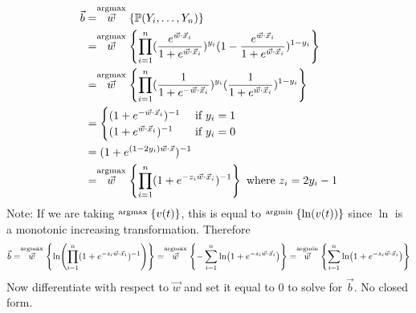 \documentclass[12pt]{article}
\begin{document}
$$\begin{aligned} \vec{b} &= \stackrel{\text{argmax}}{\vec{w}} \left\{ \mathbb{P}(Y_i, \dots,Y_n) \right\} 
\\ &= \stackrel{\text{argmax}}{\vec{w}} \left\{ \prod_{i=1}^n (\frac{e^{\vec{w} \cdot \vec{x}_i}}{1 + e^{\vec{w} \cdot \vec{x}_i}})^{y_i}(1 - \frac{e^{\vec{w} \cdot \vec{x}_i}}{1 + e^{\vec{w} \cdot \vec{x}_i}})^{1 - y_i} \right\} 
\\ &= \stackrel{\text{argmax}}{\vec{w}} \left\{  \prod_{i=1}^n (\frac{1}{1 + e^{-\vec{w} \cdot \vec{x}_i}})^{y_i}(\frac{1}{1+e^{\vec{w} \cdot \vec{x}_i}})^{1 - y_i} \right\} 
\\ &= \begin{cases} (1 + e^{-\vec{w} \cdot \vec{x}_i})^{-1} &\text{ if } y_i = 1 
\\ (1 + e^{\vec{w} \cdot \vec{x}_i})^{-1} &\text{ if } y_i = 0 \end{cases} 
\\ &= (1 + e^{(1 - 2y_i)\vec{w} \cdot \vec{x}})^{-1} 
\\ &= \stackrel{\text{argmax}}{\vec{w}}\left\{ \prod_{i=1}^n (1 + e^{-z_i\vec{w} \cdot \vec{x}_i})^{-1} \right\} 
\text{ where } z_i = 2y_i - 1 \end{aligned} $$ 
Note: If we are taking $\stackrel{\text{argmax}}{} \left\{ v(t) \right\}$, this is equal to $\stackrel{\text{argmin}}{} \left\{ \ln(v(t)) \right\}$ since $\ln$ is a monotonic increasing transformation. Therefore $$ \vec{b} = \stackrel{\text{argmax}}{\vec{w}} \left\{ \ln(\prod_{i=1}^n (1 + e^{-z_i\vec{w} \cdot \vec{x}_i})^{-1}) \right\} = \stackrel{\text{argmax}}{\vec{w}}\left\{ -\sum_{i=1}^n \ln (1 + e^{-z_i\vec{w} \cdot \vec{x}_i}) \right\} = \stackrel{\text{argmin}}{\vec{w}}\left\{ \sum_{i=1}^n \ln(1 + e^{-z_i\vec{w}\cdot\vec{x}_i}) \right\} $$ Now differentiate with respect to $\vec{w}$ and set it equal to $0$ to solve for $\vec{b}$. No closed form. 
\end{document}
